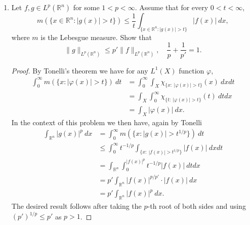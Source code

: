 \documentclass[11pt,letterpaper]{report}
\newcommand{\reals}{\mathbb{R}}
\newcommand{\Lp}[2]{\left\|{#1}\right\|_{L^{#2}}}
\begin{document}
\begin{enumerate}
\begin{proof}
		Observe that
		\[
		\Lp{g(x+\alpha)-g_k(x+\alpha_k)}{1} \leq \Lp{g(x+\alpha)-g(x+\alpha_k)}{1} + \Lp{g(x+\alpha_k)-g_k(x+\alpha_k)}{1}.
		\]
		Now since $g_k\to g$ in $L^1$, given $\epsilon>0$ the second integral on the RHS is less than $\epsilon$ for $k$ sufficiently large. Furthermore, a standard approximation by compactly supported continuous functions shows that the first integral can be made less than $\epsilon$ for $k$ large.
	\end{proof}


	\item Let $f,g\in L^p(\reals^n)$ for some $1<p<\infty$. Assume that for every $0<t<\infty$,
	\[
	m(\{x\in \reals^n: |g(x)|>t\})\leq \frac{1}{t}\int_{\{x\in \reals^n: |g(x)|>t\}}|f(x)|\ dx,
	\]
	where $m$ is the Lebesgue measure. Show that
	\[
	\|g\|_{L^p(\reals^n)}\leq p'\|f\|_{L^p(\reals^n)},\quad \frac{1}{p}+\frac{1}{p'} = 1.
	\]
	\begin{proof}
		By Tonelli's theorem we have for any $L^1(X)$ function $\varphi$,
		\begin{align*}
			\int_0^\infty m(\{x: |\varphi(x)|>t\})\ dt &= \int_0^\infty \int_X\chi_{\{x:\ |\varphi(x)|>t\}}(x)\ dxdt\\
			&= \int_X\int_0^\infty\chi_{\{t:\ |\varphi(x)|>t\}}(t)\ dtdx\\
			&= \int_X|\varphi(x)|\ dx.
		\end{align*}
		In the context of this problem we then have, again by Tonelli
		\begin{align*}
			\int_{\reals^n}|g(x)|^p\ dx &= \int_0^\infty m(\{x: |g(x)|>t^{1/p}\})\ dt\\
			&\leq \int_0^\infty t^{-1/p}\int_{\{x:\ |f(x)|>t^{1/p}\}}|f(x)|\ dxdt\\
			&=\int_{\reals^n}\int_0^{|f(x)|^p} t^{-1/p}|f(x)|\ dtdx\\
			&= p'\int_{\reals^n}|f(x)|^{p/p'}\cdot |f(x)|\ dx\\
			&= p'\int_{\reals^n}|f(x)|^p\ dx.
		\end{align*}
		The desired result follows after taking the $p$-th root of both sides and using $(p')^{1/p}\leq p'$ as $p>1$.
	\end{proof}


\end{enumerate}
\end{document}
